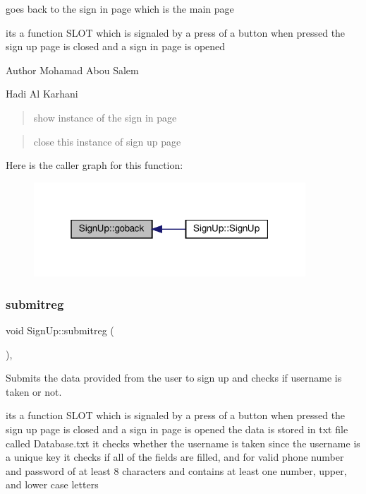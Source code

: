 goes back to the sign in page which is the main page 

its a function S\+L\+OT which is signaled by a press of a button when pressed the sign up page is closed and a sign in page is opened

\begin{DoxyAuthor}{Author}
Mohamad Abou Salem 

Hadi Al Karhani 
\end{DoxyAuthor}
\begin{quote}
show instance of the sign in page \end{quote}


\begin{quote}
close this instance of sign up page \end{quote}
Here is the caller graph for this function\+:
\nopagebreak
\begin{figure}[H]
\begin{center}
\leavevmode
\includegraphics[width=289pt]{classSignUp_a1539bfb27c3778d424ebeb4c50210e3d_icgraph}
\end{center}
\end{figure}
\mbox{\label{classSignUp_aad0f6a54d93f8354e13db101189e2319}} 
\subsubsection{\texorpdfstring{submitreg}{submitreg}}
{\footnotesize\ttfamily void Sign\+Up\+::submitreg (\begin{DoxyParamCaption}{ }\end{DoxyParamCaption})\hspace{0.3cm}{\ttfamily [private]}, {\ttfamily [slot]}}



Submits the data provided from the user to sign up and checks if username is taken or not. 

its a function S\+L\+OT which is signaled by a press of a button when pressed the sign up page is closed and a sign in page is opened the data is stored in txt file called Database.\+txt it checks whether the username is taken since the username is a unique key it checks if all of the fields are filled, and for valid phone number and password of at least 8 characters and contains at least one number, upper, and lower case letters


